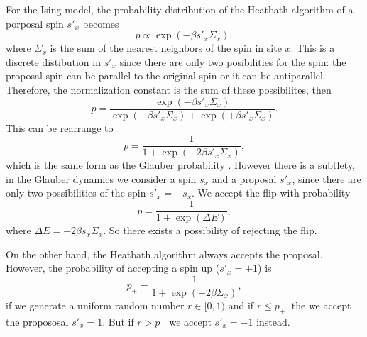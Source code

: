\documentclass[12pt,a4paper]{article}
\begin{document}
For the Ising model, the probability distribution of the Heatbath algorithm of a porposal spin $s'_x$ becomes
\begin{equation}
	p \propto \exp(-\beta s'_x\Sigma_x),
\end{equation}
where $\Sigma_x$ is the sum of the nearest neighbors of the spin in site $x$. This is a discrete distibution in $s'_x$ since there are only two posibilities for the spin: the proposal spin can be parallel to the original spin or it can be antiparallel. Therefore, the normalization constant is the sum of these possibilites, then
\begin{equation}
	p = \frac{\exp(-\beta s'_x\Sigma_x)}{\exp(-\beta s'_x\Sigma_x) + \exp(+\beta s'_x\Sigma_x)}.
\end{equation} 
This can be rearrange to
\begin{equation}
	p = \frac{1}{1 + \exp(-2\beta s'_x\Sigma_x)},
\end{equation}
which is the same form as the Glauber probability \cite{Glauber}. However there is a subtlety, in the Glauber dynamics we consider a spin $s_x$ and a proposal $s'_x$, since there are only two possibilities of the spin $s'_x = -s_x$. We accept the flip with probability
\begin{equation}
    p = \frac{1}{1 + \exp(\Delta E)},
\end{equation}
where $\Delta E = -2\beta s_x\Sigma_x$. So there exists a possibility of rejecting the flip.

On the other hand, the Heatbath algorithm always accepts the proposal. However, the probability of accepting a spin up ($s'_x = +1$) is
\begin{equation}
    p_+= \frac{1}{1 + \exp(-2\beta\Sigma_x)},
\end{equation}
if we generate a uniform random number $r\in[0,1)$ and if $r\le p_+$, the we accept the propososal $s'_x = 1$. But if $r > p_+$ we accept $s'_x = -1$ instead. 

\newpage
\end{document}
